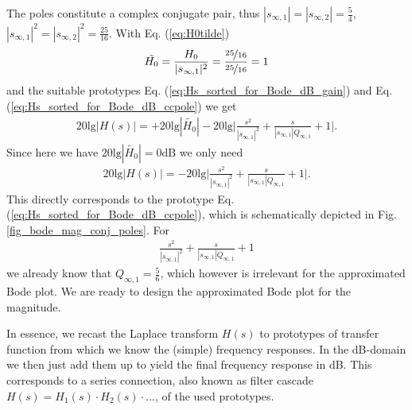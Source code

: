 \documentclass[11pt,a4paper,DIV=12]{scrartcl}
\numberwithin{equation}{section}
\numberwithin{figure}{section}
\newcommand{\eq}[1]{Eq. (\ref{#1})} %
\begin{document}
\begin{ExCalc}
The poles constitute a complex conjugate pair, thus
$|s_{\infty,1}| = |s_{\infty,2}| = \frac{5}{4}$, $|s_{\infty,1}|^2 = |s_{\infty,2}|^2 = \frac{25}{16}$.
%
With \eq{eq:H0tilde}
\begin{align}
\tilde{H_0} = \frac{H_0}{|s_{\infty,1}|^2} = \frac{\nicefrac{25}{16}}{\nicefrac{25}{16}} = 1
\end{align}
and the suitable prototypes \eq{eq:Hs_sorted_for_Bode_dB_gain} and \eq{eq:Hs_sorted_for_Bode_dB_ccpole}
we get
\begin{align}
20 \text{lg} |H(s)| =
+20 \text{lg} |\tilde{H_0}|
-20 \text{lg} \bigg|\frac{s^2}{|s_{\infty,1}|^2} + \frac{s}{|s_{\infty,1}| Q_{\infty,1}} + 1\bigg|.
\end{align}
Since here we have $20 \text{lg} |\tilde{H_0}|=0\mathrm{dB}$ we only need
\begin{align}
20 \text{lg} |H(s)| =
-20 \text{lg} \bigg|\frac{s^2}{|s_{\infty,1}|^2} + \frac{s}{|s_{\infty,1}| Q_{\infty,1}} + 1\bigg|.
\end{align}
This directly corresponds to the prototype \eq{eq:Hs_sorted_for_Bode_dB_ccpole}, which
is schematically depicted in Fig. \ref{fig_bode_mag_conj_poles}.
For
\begin{align}
\frac{s^2}{|s_{\infty,1}|^2} + \frac{s}{|s_{\infty,1}| Q_{\infty,1}} + 1
\end{align}
we already know that $Q_{\infty,1}=\frac{5}{6}$, which however is irrelevant for the
approximated Bode plot.
%
%
We are ready to design the approximated Bode plot for the magnitude.

In essence, we recast the Laplace transform $H(s)$ to prototypes of transfer function
from which we know the (simple) frequency responses. In the dB-domain
we then just add them up to yield the final frequency response in dB.
This corresponds to a series connection, also known as filter cascade
$H(s)=H_1(s)\cdot H_2(s)\cdot\dots$, of the used prototypes.

%
\end{ExCalc}
\end{document}
